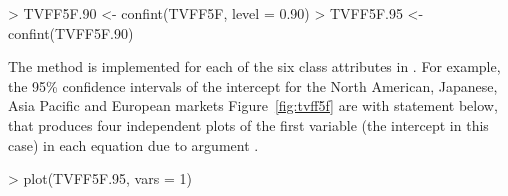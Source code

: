 \begin{Schunk}
\begin{Sinput}
> TVFF5F.90 <- confint(TVFF5F, level = 0.90)
> TVFF5F.95 <- confint(TVFF5F.90)
\end{Sinput}
\end{Schunk}

The  method is implemented for each of the six class attributes in . For example, the 95\% confidence intervals of the intercept for the North American, Japanese, Asia Pacific and European markets Figure~\ref{fig:tvff5f} are with  statement below, that produces four independent plots of the first variable (the intercept in this case) in each equation due to argument .

\begin{Schunk}
\begin{Sinput}
> plot(TVFF5F.95, vars = 1)
\end{Sinput}
\end{Schunk}


